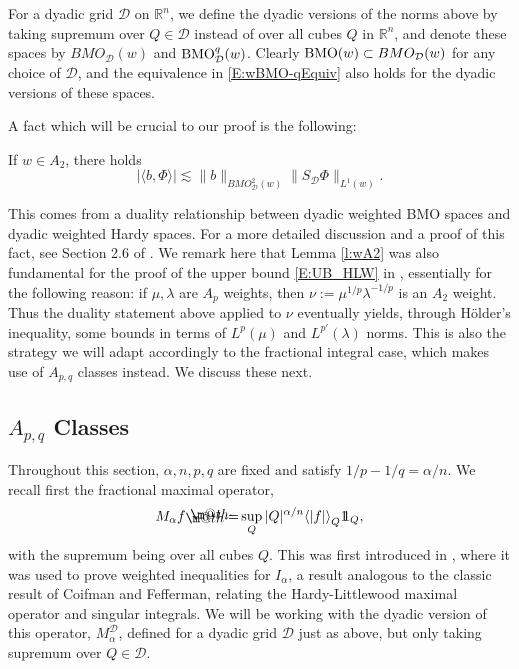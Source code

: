 \documentclass[12pt]{amsart}
\begin{document}
For a dyadic grid ${\mathcal{D}}$ on ${\mathbb{R}}^n$, we define the dyadic versions of the norms 
above by taking supremum over $Q \in {\mathcal{D}}$ instead of over all cubes $Q$ in 
${\mathbb{R}}^n$, and denote these spaces by ${BMO_{\mathcal{D}}(w)}$ and ${\textnormal{BMO}}^q_{\mathcal{D}}(w)$. 
Clearly ${\textnormal{BMO}}(w) \subset {BMO_{\mathcal{D}}(w)}$ for any choice of ${\mathcal{D}}$, and the equivalence in
\eqref{E:wBMO-qEquiv} also holds for the dyadic versions of these spaces. 
	
A fact which will be crucial to our proof is the following:
\begin{lm}\label{l:wA2} If $ w \in A_2$, there holds 
	\begin{equation} \label{E:H1BMODual1}
	\left|{\langle } b, \Phi{\rangle }\right| \lesssim   \|b\|_{BMO^2_{\mathcal{D}}(w)} \|S_{\mathcal{D}}\Phi\|_{L^1(w)}.
	\end{equation}
\end{lm}
This comes from a duality relationship between dyadic weighted BMO spaces and dyadic weighted Hardy spaces. For a more detailed discussion and a proof of this fact, see Section 2.6 of \cite{HolLacWic2015b}. We remark here that Lemma \ref{l:wA2} was also fundamental for the proof of the upper bound \eqref{E:UB_HLW} in \cite{HolLacWic2015b}, essentially for the following reason: if $\mu, {\lambda}$ are $A_p$ weights, then $\nu := \mu^{1/p}{\lambda}^{-1/p}$ is an $A_2$ weight. Thus the duality statement above applied to $\nu$ eventually yields, through H{\"o}lder's inequality, some bounds in terms of $L^p(\mu)$ and $L^{p'}({\lambda})$ norms. This is also the strategy we will adapt accordingly to the fractional integral case, which makes use of $A_{p,q}$ classes instead. We discuss these next.

\subsection{$A_{p,q}$ Classes} 

Throughout this section, $\alpha,n,p,q$ are fixed and satisfy 
$1/p - 1/q = \alpha/n$. We recall first the fractional maximal operator,
	$$M_{\alpha}f {\mathrel{\rlap{                     \raisebox{0.3ex}{$\m@th\cdot$}}                     \raisebox{-0.3ex}{$\m@th\cdot$}}                     =} \sup_Q |Q|^{\alpha/n} {\langle } |f| {\rangle }_Q {1\!\!1}_Q,$$
with the supremum being over all cubes $Q$. This was first introduced in  \cite{MuckWheedenFrac}, where it was used to prove weighted inequalities for $I_{\alpha}$, a result analogous to the classic result \cite{CoifFeff} of Coifman and Fefferman, relating the Hardy-Littlewood maximal operator and singular integrals. We will be working with the dyadic version of this operator, $M_{\alpha}^{{\mathcal{{D}}}}$, defined for a dyadic grid ${\mathcal{{D}}}$ just as above, but only taking supremum over $Q\in{\mathcal{{D}}}$.
\end{document}
